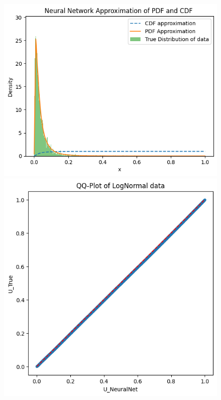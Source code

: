 \begin{figure}
\begin{minipage}{0.45\textwidth}
\begin{minipage}{0.48\textwidth}
        \end{minipage}
    \end{minipage}
    \hfill
    \begin{minipage}{0.45\textwidth}
        \centering
        \begin{minipage}{0.48\textwidth}
            \centering
            \includegraphics[width=\textwidth]{5ResultsDiscussion/pictures/MarginalTest/LognormalHistogram.png}
        \end{minipage}
        \hfill
        \begin{minipage}{0.48\textwidth}
            \centering
            \includegraphics[width=\textwidth]{5ResultsDiscussion/pictures/MarginalTest/LognormalQQ.png}

\end{minipage}
\end{minipage}
\end{figure}
